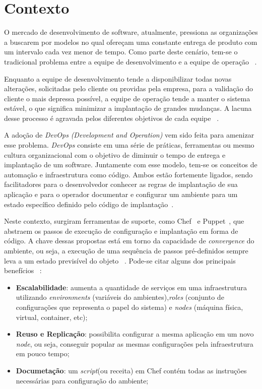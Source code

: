 \section{Contexto}
\label{sec:contexto}

O mercado de desenvolvimento de software, atualmente, pressiona as organizações
a buscarem por modelos no qual ofereçam uma constante entrega de produto com
um intervalo cada vez menor de tempo. Como parte deste cenário, tem-se o
tradicional problema entre a equipe de desenvolvimento e a equipe de operação
~\cite{hummer:2013}.

Enquanto a equipe de desenvolvimento tende a disponibilizar todas novas alterações,
solicitadas pelo cliente ou providas pela empresa, para a validação do cliente o
mais depressa possível, a equipe de operação tende a manter o sistema estável,
o que significa minimizar a implantação de grandes mudanças. A lacuna desse
processo é agravada pelos diferentes objetivos de cada equipe
~\cite{huttermann:2012}.

A adoção de \textit{DevOps} \textit{(Development and Operation)} vem sido feita
para amenizar esse problema. \textit{DevOps} consiste em uma série de práticas,
ferramentas ou mesmo cultura organizacional com o objetivo de diminuir o tempo
de entrega e implantação de um software. Juntamente com esse modelo,
tem-se os conceitos de automação e infraestrutura
como código. Ambos estão fortemente ligados, sendo facilitadores para o
desenvolvedor conhecer as regras de implantação de sua aplicação
e para o operador documentar e configurar um ambiente para um estado específico
definido pelo código de implantação~\cite{hummer:2013}.

Neste contexto, surgiram ferramentas de suporte, como Chef~\cite{chef:2016} e
Puppet~\cite{puppet:2016}, que abstraem os passos de execução de configuração
e implantação em forma de código. A chave dessas propostas está em torno
da capacidade de \textit{convergence} do ambiente, ou seja, a execução de uma
sequência de passos pré-definidos sempre leva a um estado previsível do objeto
~\cite{hummer:2013}. Pode-se citar alguns dos principais benefícios
~\cite{vasiliev:2014}:

\begin{itemize}
  \item \textbf{Escalabilidade}: aumenta a quantidade de serviços em uma infraestrutura
    utilizando \textit{environments} (variáveis do ambientes),\textit{roles}
    (conjunto de configurações que representa o papel do sistema) e \textit{nodes}
    (máquina física, virtual, container, etc);
  \item \textbf{Reuso e Replicação}: possibilita configurar a mesma aplicação em um novo \textit{node}, ou seja,
    conseguir popular as mesmas configurações pela infraestrutura em pouco tempo;
  \item \textbf{Documetação}: um \textit{script}(ou receita) em Chef contém todas as instruções necessárias
    para configuração do ambiente;
\end{itemize}

